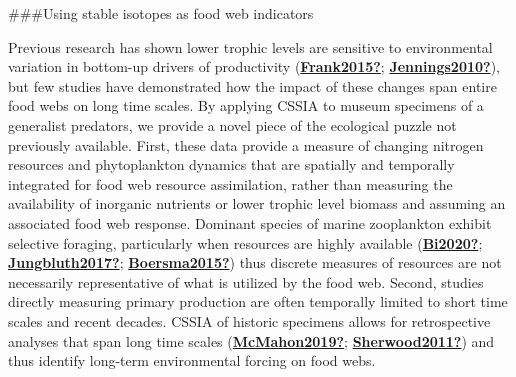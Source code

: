 \documentclass [11pt, proquest] {uwthesis}[2015/03/03]
\begin{document}
\#\#\#Using stable isotopes as food web indicators

Previous research has shown lower trophic levels are sensitive to environmental variation in bottom-up drivers of productivity (\protect\hyperlink{ref-Frank2015}{\textbf{Frank2015?}}; \protect\hyperlink{ref-Jennings2010}{\textbf{Jennings2010?}}), but few studies have demonstrated how the impact of these changes span entire food webs on long time scales. By applying CSSIA to museum specimens of a generalist predators, we provide a novel piece of the ecological puzzle not previously available. First, these data provide a measure of changing nitrogen resources and phytoplankton dynamics that are spatially and temporally integrated for food web resource assimilation, rather than measuring the availability of inorganic nutrients or lower trophic level biomass and assuming an associated food web response. Dominant species of marine zooplankton exhibit selective foraging, particularly when resources are highly available (\protect\hyperlink{ref-Bi2020}{\textbf{Bi2020?}}; \protect\hyperlink{ref-Jungbluth2017}{\textbf{Jungbluth2017?}}; \protect\hyperlink{ref-Boersma2015}{\textbf{Boersma2015?}}) thus discrete measures of resources are not necessarily representative of what is utilized by the food web. Second, studies directly measuring primary production are often temporally limited to short time scales and recent decades. CSSIA of historic specimens allows for retrospective analyses that span long time scales (\protect\hyperlink{ref-McMahon2019}{\textbf{McMahon2019?}}; \protect\hyperlink{ref-Sherwood2011}{\textbf{Sherwood2011?}}) and thus identify long-term environmental forcing on food webs.
\end{document}

